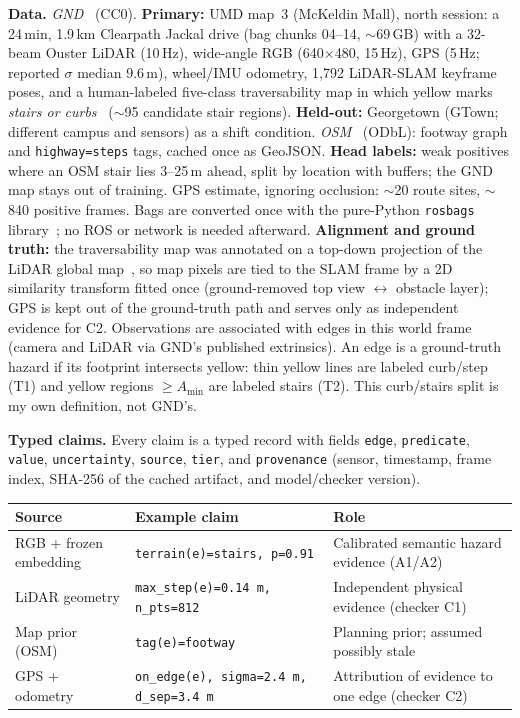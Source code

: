 \documentclass[10pt,letterpaper]{article}
\newcommand{\cl}[1]{\texttt{#1}}
\begin{document}
\textbf{Data.} \emph{GND}~\cite{gnd} (CC0). \textbf{Primary:} UMD map~3 (McKeldin Mall), north
session: a 24\,min, 1.9\,km Clearpath Jackal drive (bag chunks 04--14, $\sim$69\,GB) with a 32-beam
Ouster LiDAR (10\,Hz), wide-angle RGB (640$\times$480, 15\,Hz), GPS (5\,Hz; reported $\sigma$ median
9.6\,m), wheel/IMU odometry, 1,792 LiDAR-SLAM keyframe poses, and a human-labeled five-class
traversability map in which yellow marks \emph{stairs or curbs}~\cite{gnd} ($\sim$95 candidate stair
regions). \textbf{Held-out:} Georgetown (GTown; different campus and
sensors) as a shift condition.
\emph{OSM}~\cite{osm} (ODbL): footway graph and \cl{highway=steps} tags, cached once as GeoJSON.
\textbf{Head labels:} weak positives where an OSM stair lies 3--25\,m ahead, split by location with buffers;
the GND map stays out of training. GPS estimate, ignoring occlusion: $\sim$20 route sites, $\sim$840 positive frames.
Bags are converted once with the pure-Python \cl{rosbags} library~\cite{rosbags}; no ROS or network
is needed afterward. \textbf{Alignment and ground truth:} the traversability map was annotated on a
top-down projection of the LiDAR global map~\cite{gnd}, so map pixels are tied to the SLAM frame by a
2D similarity transform fitted once (ground-removed top view $\leftrightarrow$ obstacle layer); GPS is
kept out of the ground-truth path and serves only as independent evidence for C2. Observations are
associated with edges in this world frame (camera and LiDAR via GND's published extrinsics). An edge is a ground-truth hazard if its footprint intersects yellow:
thin yellow lines are labeled curb/step (T1) and yellow regions $\ge A_{\min}$ are labeled stairs (T2).
This curb/stairs split is my own definition, not GND's.

\textbf{Typed claims.} Every claim is a typed record with fields \cl{edge}, \cl{predicate},
\cl{value}, \cl{uncertainty}, \cl{source}, \cl{tier}, and \cl{provenance} (sensor, timestamp, frame
index, SHA-256 of the cached artifact, and model/checker version).
\begin{center}\small
\begin{tabularx}{\linewidth}{@{}llX@{}}
\toprule
Source & Example claim & Role \\
\midrule
RGB + frozen embedding & \cl{terrain(e)=stairs, p=0.91} & Calibrated semantic hazard evidence (A1/A2) \\
LiDAR geometry & \cl{max\_step(e)=0.14\,m, n\_pts=812} & Independent physical evidence (checker C1) \\
Map prior (OSM) & \cl{tag(e)=footway} & Planning prior; assumed possibly stale \\
GPS + odometry & \cl{on\_edge(e), sigma=2.4\,m, d\_sep=3.4\,m} & Attribution of evidence to one edge (checker C2) \\
\bottomrule
\end{tabularx}
\end{center}
\end{document}
